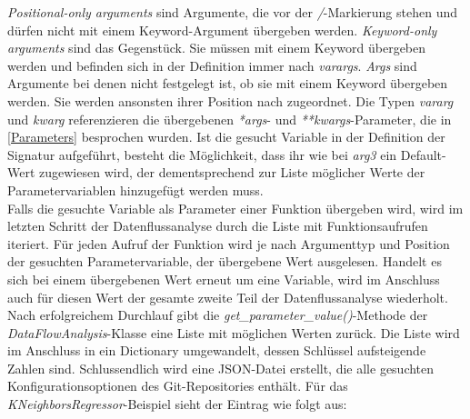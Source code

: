 \documentclass[german,bachelor]{swsLeipzig}
\begin{document}
\textit{Positional-only arguments} sind Argumente, die vor der \textit{/}-Markierung stehen und dürfen nicht mit einem
Keyword-Argument übergeben werden.
\textit{Keyword-only arguments} sind das Gegenstück.
Sie müssen mit einem Keyword übergeben werden und befinden sich in der Definition immer nach \textit{varargs}.
\textit{Args} sind Argumente bei denen nicht festgelegt ist, ob sie mit einem Keyword übergeben werden.
Sie werden ansonsten ihrer Position nach zugeordnet.
Die Typen \textit{vararg} und \textit{kwarg} referenzieren die übergebenen \textit{*args}- und \textit{**kwargs}-Parameter,
die in \ref{Parameters} besprochen wurden.
Ist die gesucht Variable in der Definition der Signatur aufgeführt, besteht die Möglichkeit, dass ihr wie bei \textit{arg3} ein Default-Wert
zugewiesen wird, der dementsprechend zur Liste möglicher Werte der Parametervariablen hinzugefügt werden muss.\\

Falls die gesuchte Variable als Parameter einer Funktion übergeben wird, wird im letzten Schritt der Datenflussanalyse
durch die Liste mit Funktionsaufrufen iteriert.
Für jeden Aufruf der Funktion wird je nach Argumenttyp und Position der gesuchten Parametervariable, der übergebene
Wert ausgelesen.
Handelt es sich bei einem übergebenen Wert erneut um eine Variable, wird im Anschluss auch für diesen Wert
der gesamte zweite Teil der Datenflussanalyse wiederholt. \\

Nach erfolgreichem Durchlauf gibt die \textit{get\_parameter\_value()}-Methode der \textit{DataFlowAnalysis}-Klasse
eine Liste mit möglichen Werten zurück.
Die Liste wird im Anschluss in ein Dictionary umgewandelt, dessen Schlüssel aufsteigende Zahlen sind.
Schlussendlich wird eine JSON-Datei erstellt, die alle gesuchten Konfigurationsoptionen des Git-Repositories enthält.
Für das \textit{KNeighborsRegressor}-Beispiel sieht der Eintrag wie folgt aus: \\
\end{document}
